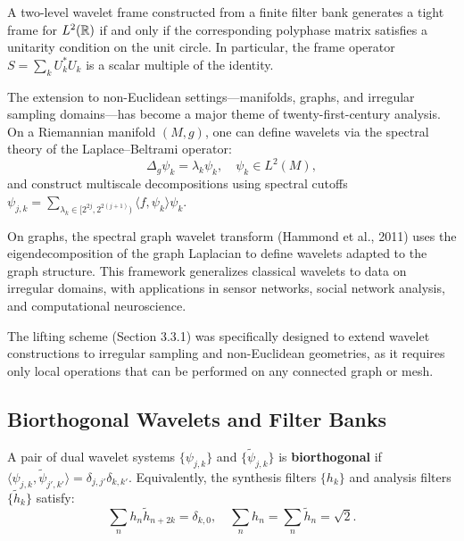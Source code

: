 \begin{theorem}
A two-level wavelet frame constructed from a finite filter bank generates a tight frame for $L^2(\mathbb{R})$ if and only if the corresponding polyphase matrix satisfies a unitarity condition on the unit circle. In particular, the frame operator $S = \sum_k U_k^* U_k$ is a scalar multiple of the identity.
\end{theorem}

The extension to non-Euclidean settings---manifolds, graphs, and irregular sampling domains---has become a major theme of twenty-first-century analysis. On a Riemannian manifold $(M, g)$, one can define wavelets via the spectral theory of the Laplace--Beltrami operator:
\[
\Delta_g \psi_k = \lambda_k \psi_k, \quad \psi_k \in L^2(M),
\]
and construct multiscale decompositions using spectral cutoffs $\psi_{j,k} = \sum_{\lambda_k \in [2^{2j}, 2^{2(j+1)})} \langle f, \psi_k \rangle \psi_k$.

\begin{remark}
On graphs, the spectral graph wavelet transform (Hammond et al., 2011) uses the eigendecomposition of the graph Laplacian to define wavelets adapted to the graph structure. This framework generalizes classical wavelets to data on irregular domains, with applications in sensor networks, social network analysis, and computational neuroscience.
\end{remark}

The lifting scheme (Section 3.3.1) was specifically designed to extend wavelet constructions to irregular sampling and non-Euclidean geometries, as it requires only local operations that can be performed on any connected graph or mesh.

\subsection{Biorthogonal Wavelets and Filter Banks}

\begin{definition}
A pair of dual wavelet systems $\{\psi_{j,k}\}$ and $\{\widetilde{\psi}_{j,k}\}$ is \textbf{biorthogonal} if $\langle \psi_{j,k}, \widetilde{\psi}_{j',k'} \rangle = \delta_{j,j'} \delta_{k,k'}$. Equivalently, the synthesis filters $\{h_k\}$ and analysis filters $\{\widetilde{h}_k\}$ satisfy:
\[
\sum_n h_n \widetilde{h}_{n + 2k} = \delta_{k,0}, \quad \sum_n h_n = \sum_n \widetilde{h}_n = \sqrt{2}.
\]
\end{definition}

